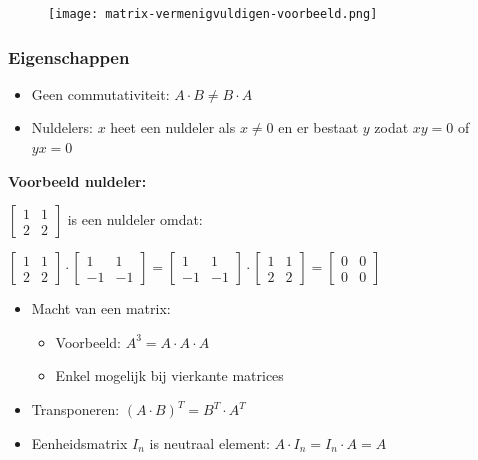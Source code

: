 \documentclass{article}
\begin{document}
\begin{figure}[H]
    \centering
    \texttt{[image: matrix-vermenigvuldigen-voorbeeld.png]}
\end{figure}


\subsubsection{Eigenschappen}

\begin{itemize}
    \item Geen commutativiteit: $A \cdot B \neq B \cdot A$
    \item Nuldelers: $x$ heet een nuldeler als $x \neq 0$ en er bestaat $y$ zodat $xy = 0$ of $yx = 0$
\end{itemize}

\textbf{Voorbeeld nuldeler:}

$\begin{bmatrix}
1 & 1\\
2 & 2
\end{bmatrix}$ is een nuldeler omdat: 

$\begin{bmatrix}
    1 & 1\\
    2 & 2
\end{bmatrix} \cdot 
\begin{bmatrix}
    1 & 1\\
    -1 & -1
\end{bmatrix} = 
\begin{bmatrix}
    1 & 1\\
    -1 & -1
\end{bmatrix}
 \cdot 
\begin{bmatrix}
    1 & 1\\
    2 & 2
\end{bmatrix} =
\begin{bmatrix}
    0 & 0\\
    0 & 0
\end{bmatrix}$

\begin{itemize}
    \item Macht van een matrix:
    \begin{itemize}
        \item Voorbeeld: $A^3 = A \cdot A \cdot A$
        \item Enkel mogelijk bij vierkante matrices
    \end{itemize}
    \item Transponeren: $(A\cdot B)^T = B^T \cdot A^T$
    \item Eenheidsmatrix $I_n$ is neutraal element: $A \cdot I_n = I_n \cdot A = A$
\end{itemize}
\end{document}
